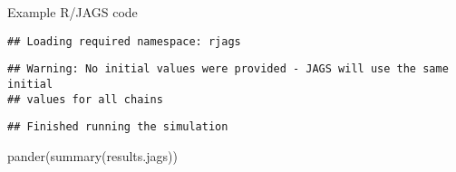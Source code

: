 \documentclass[
  ignorenonframetext,
]{beamer}
\newenvironment{Shaded}{\begin{snugshade}}{\end{snugshade}}
\newcommand{\FunctionTok}[1]{\textcolor[rgb]{0.00,0.00,0.00}{#1}}
\newcommand{\NormalTok}[1]{#1}
\begin{document}
\begin{frame}[fragile]{Example R/JAGS code}
\begin{verbatim}
## Loading required namespace: rjags
\end{verbatim}

\begin{verbatim}
## Warning: No initial values were provided - JAGS will use the same initial
## values for all chains
\end{verbatim}

\begin{verbatim}
## Finished running the simulation
\end{verbatim}

\begin{Shaded}
\begin{Highlighting}[]
\FunctionTok{pander}\NormalTok{(}\FunctionTok{summary}\NormalTok{(results.jags))}
\end{Highlighting}
\end{Shaded}


\end{frame}
\end{document}
